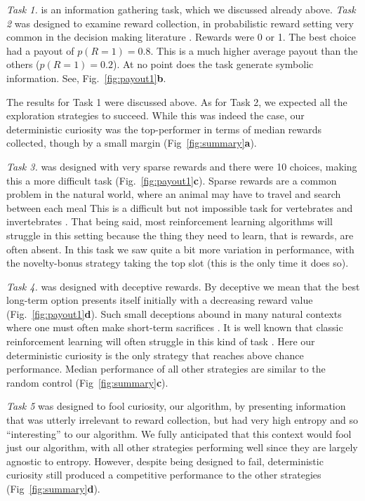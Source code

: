 \textit{Task 1.} is an information gathering task, which we discussed already above. \textit{Task 2} was designed to examine reward collection, in probabilistic reward setting very common in the decision making literature \citep{schonberg2007reinforcement,frank2004carrot,cavanagh2014conflict,jahfari2019cross,collins2014opponent,collins2017interactions,glascher2010states}. Rewards were 0 or 1. The best choice had a payout of $p(R=1) = 0.8$. This is a much higher average payout than the others ($p(R=1) = 0.2$). At no point does the task generate symbolic information. See, Fig.~\ref{fig:payout1}\textbf{b}. 

The results for Task 1 were discussed above. As for Task 2, we expected all the exploration strategies to succeed. While this was indeed the case, our deterministic curiosity was the top-performer in terms of median rewards collected, though by a small margin (Fig~\ref{fig:summary}\textbf{a}).

\textit{Task 3.} was designed with very sparse rewards \citep{Mniha,Silver2016b,Silver2018} and there were 10 choices, making this a more difficult task (Fig.~\ref{fig:payout1}\textbf{c}). Sparse rewards are a common problem in the natural world, where an animal may have to travel and search between each meal This is a difficult but not impossible task for vertebrates \citep{anderson1984optimal} and invertebrates \citep{westphal2006foraging}. That being said, most reinforcement learning algorithms will struggle in this setting because the thing they need to learn, that is rewards, are often absent. In this task we saw quite a bit more variation in performance, with the novelty-bonus strategy taking the top slot (this is the only time it does so).

\textit{Task 4.} was designed with deceptive rewards. By deceptive we mean that the best long-term option presents itself initially with a decreasing reward value (Fig.~\ref{fig:payout1}\textbf{d}). Such small deceptions abound in many natural contexts where one must often make short-term sacrifices \citep{internicola2012bumble}. It is well known that classic reinforcement learning will often struggle in this kind of task \citep{Lehman2011a,Sutton2018}. Here our deterministic curiosity is the only strategy that reaches above chance performance. Median performance of all other strategies are similar to the random control (Fig~\ref{fig:summary}\textbf{c}). 

\textit{Task 5} was designed to fool curiosity, our algorithm, by presenting information that was utterly irrelevant to reward collection, but had very high entropy and so ``interesting'' to our algorithm. We fully anticipated that this context would fool just our algorithm, with all other strategies performing well since they are largely agnostic to entropy. However, despite being designed to fail, deterministic curiosity still produced a competitive performance to the other strategies (Fig~\ref{fig:summary}\textbf{d}). 

